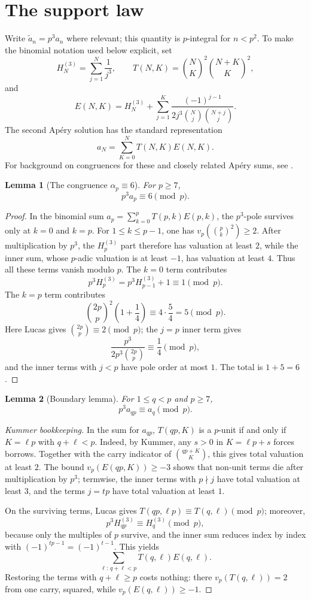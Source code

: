 \documentclass[11pt]{amsart}
\theoremstyle{plain}
\newtheorem{lemma}{Lemma}
\theoremstyle{remark}
\begin{document}
\section{The support law}

Write $\widetilde a_n=p^3a_n$ where relevant; this quantity is
$p$-integral for $n<p^2$.  To make the binomial notation used below
explicit, set
\[
 H_N^{(3)}=\sum_{j=1}^N\frac1{j^3},
 \qquad
 T(N,K)=\binom NK^2\binom{N+K}K^2,
\]
and
\[
 E(N,K)=H_N^{(3)}+
 \sum_{j=1}^K
 \frac{(-1)^{j-1}}
 {2j^3\binom Nj\binom{N+j}j}.
\]
The second Ap\'ery solution has the standard representation
\[
 a_N=\sum_{K=0}^N T(N,K)E(N,K).
\]
For background on congruences for these and closely related Ap\'ery sums,
see \cite{Mortenson2005,Sun2012,WangSun2024}.

\begin{lemma}[The congruence $\alpha_p\equiv6$]\label{lem:alpha-six}
For $p\geq7$,
\[
 p^3a_p\equiv6\pmod p.
\]
\end{lemma}

\begin{proof}
In the binomial sum
$a_p=\sum_{k=0}^pT(p,k)E(p,k)$, the $p^3$-pole survives only at
$k=0$ and $k=p$.  For $1\leq k\leq p-1$, one has
$v_p(\binom pk^2)\geq2$.  After multiplication by $p^3$, the
$H_p^{(3)}$ part therefore has valuation at least $2$, while the inner
sum, whose $p$-adic valuation is at least $-1$, has valuation at least
$4$.  Thus all these terms vanish modulo $p$.  The $k=0$ term contributes
\[
 p^3H_p^{(3)}=p^3H_{p-1}^{(3)}+1\equiv1\pmod p.
\]
The $k=p$ term contributes
\[
 \binom{2p}p^2\left(1+\frac14\right)
 \equiv4\cdot\frac54=5\pmod p.
\]
Here Lucas gives $\binom{2p}p\equiv2\pmod p$; the $j=p$ inner term
gives
\[
 \frac{p^3}{2p^3\binom{2p}p}\equiv\frac14\pmod p,
\]
and the inner terms with $j<p$ have pole order at most $1$.  The total is
$1+5=6$.
\end{proof}

\begin{lemma}[Boundary lemma]\label{lem:boundary}
For $1\leq q<p$ and $p\geq7$,
\[
 p^3a_{qp}\equiv a_q\pmod p.
\]
\end{lemma}

\begin{proof}[Kummer bookkeeping]
In the sum for $a_{qp}$, $T(qp,K)$ is a $p$-unit if and only if
$K=\ell p$ with $q+\ell<p$.  Indeed, by Kummer, any $s>0$ in
$K=\ell p+s$ forces borrows.  Together with the carry indicator of
$\binom{qp+K}K$, this gives total valuation at least $2$.  The bound
$v_p(E(qp,K))\geq-3$ shows that non-unit terms die after multiplication
by $p^3$; termwise, the inner terms with $p\nmid j$ have total valuation
at least $3$, and the terms $j=tp$ have total valuation at least $1$.

On the surviving terms, Lucas gives
$T(qp,\ell p)\equiv T(q,\ell)\pmod p$; moreover,
\[
 p^3H_{qp}^{(3)}\equiv H_q^{(3)}\pmod p,
\]
because only the multiples of $p$ survive, and the inner sum reduces
index by index with $(-1)^{tp-1}=(-1)^{t-1}$.  This yields
\[
 \sum_{\ell:\,q+\ell<p}T(q,\ell)E(q,\ell).
\]
Restoring the terms with $q+\ell\geq p$ costs nothing: there
$v_p(T(q,\ell))=2$ from one carry, squared, while
$v_p(E(q,\ell))\geq-1$.
\end{proof}
\end{document}
